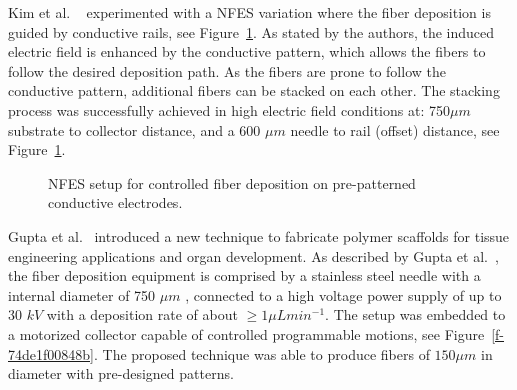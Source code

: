 Kim et al. \unskip~\cite{527120:11974313} experimented with a NFES variation where the fiber deposition is guided by conductive rails, see Figure~\ref{f-927e96fb5537}. As stated by the authors, the induced electric field is enhanced by the conductive pattern, which allows the fibers to follow the desired deposition path. As the fibers are prone to follow the conductive pattern, additional fibers can be stacked on each other. The stacking process was successfully achieved in high electric field conditions at: 750$\mu m $ substrate to collector distance, and a 600 $\mu m $ needle to rail (offset) distance, see Figure~\ref{f-927e96fb5537}.


\bgroup
\begin{figure}[!htbp]
\centering \makeatletter{}
\makeatother 
\caption{{NFES setup for controlled fiber deposition on pre-patterned conductive electrodes. \unskip~\protect\cite{527120:11974313}}}
\label{f-927e96fb5537}
\end{figure}
\egroup
Gupta et al.\unskip~\cite{527120:11974310} introduced a new technique to fabricate polymer scaffolds for tissue engineering applications and organ development. As described by Gupta et al.\unskip~\cite{527120:11974310}, the fiber deposition equipment is comprised by a stainless steel needle with a internal diameter of 750 $\mu m $ , connected to a high voltage power supply of up to 30 $k V $ with a deposition rate of about $\geq 1 \mu L min^{-1} $. The setup was embedded to a motorized collector capable of controlled programmable motions, see Figure~\ref{f-74de1f00848b}. The proposed technique was able to produce fibers of $150 \mu m $ in diameter with pre-designed patterns.


